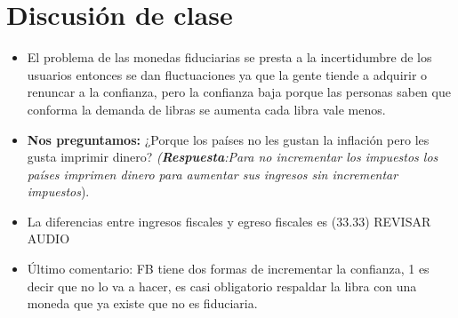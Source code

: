 \section{Discusión de clase}
\begin{itemize}
    \item El problema de las monedas fiduciarias se presta a la incertidumbre de los usuarios entonces se dan fluctuaciones ya que la gente tiende a adquirir o renuncar a la confianza, pero la confianza baja porque las personas saben que conforma la demanda de libras se aumenta cada libra vale menos.
    \item \textbf{Nos preguntamos:} ¿Porque los países no les gustan la inflación pero les gusta imprimir dinero? \emph{(\textbf{Respuesta}:Para no incrementar los impuestos los países imprimen dinero para aumentar sus ingresos sin incrementar impuestos}).
    \item La diferencias entre ingresos fiscales y egreso fiscales es (33.33) REVISAR AUDIO 
    \item Último comentario: FB tiene dos formas de incrementar la confianza, 1 es decir que no lo va a hacer, es casi obligatorio respaldar la libra con una moneda que ya existe que no es fiduciaria. 
\end{itemize}

